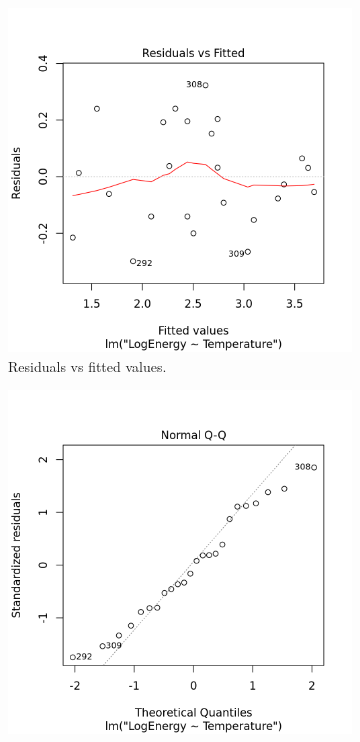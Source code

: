 \documentclass[11pt]{article}
\begin{document}
\begin{figure}[ht] \centering
  \begin{subfigure}{0.32\textwidth}
    \includegraphics[width=\textwidth]{denver_diagnostic001.png}
    \caption{Residuals vs fitted values.}
    \label{fig:denver_resid}
  \end{subfigure}%
  \hfill
  \begin{subfigure}{0.32\textwidth}
    \includegraphics[width=\textwidth]{denver_diagnostic002.png}

\end{subfigure}
\end{figure}
\end{document}
